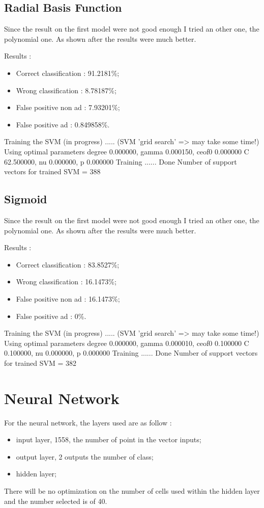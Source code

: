 \subsection{Radial Basis Function}

Since the result on the first model were not good enough I tried an other one, the polynomial one. As shown after the results were much better.

Results :
\begin{itemize}
  \item Correct classification : 91.2181\%;
  \item Wrong classification : 8.78187\%;
  \item False positive non ad : 7.93201\%;
  \item False positive ad : 0.849858\%.
\end{itemize}
Training the SVM (in progress) ..... (SVM 'grid search' => may take some time!)
Using optimal parameters degree 0.000000, gamma 0.000150, ceof0 0.000000
	 C 62.500000, nu 0.000000, p 0.000000
 Training ...... Done
Number of support vectors for trained SVM = 388


\subsection{Sigmoid}

Since the result on the first model were not good enough I tried an other one, the polynomial one. As shown after the results were much better.

Results :
\begin{itemize}
  \item Correct classification : 83.8527\%;
  \item Wrong classification : 16.1473\%;
  \item False positive non ad : 16.1473\%;
  \item False positive ad : 0\%.
\end{itemize}
Training the SVM (in progress) ..... (SVM 'grid search' => may take some time!)
Using optimal parameters degree 0.000000, gamma 0.000010, ceof0 0.100000
	 C 0.100000, nu 0.000000, p 0.000000
 Training ...... Done
Number of support vectors for trained SVM = 382

\section{Neural Network}
For the neural network, the layers used are as follow :
  \begin{itemize}
    \item input layer, 1558, the number of point in the vector inputs;
    \item output layer, 2 outputs the number of class;
    \item hidden layer;
  \end{itemize}
  There will be no optimization on the number of cells used within the hidden layer and the number selected is of 40.


